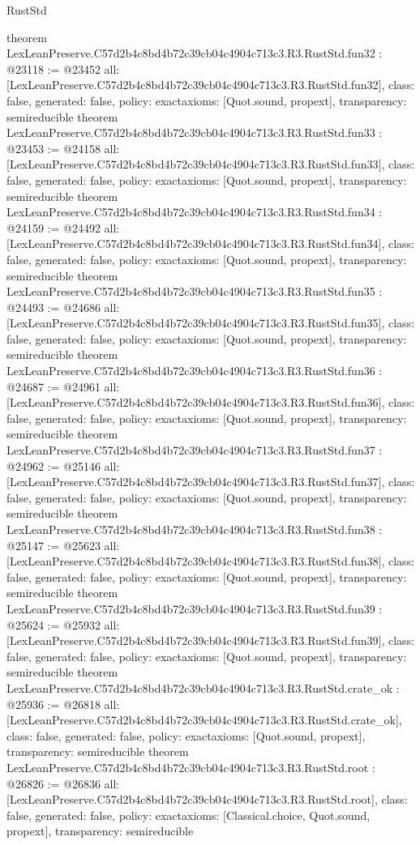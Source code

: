 \begin{lexlean}{RustStd}
\begin{coremodule}
{}
theorem LexLeanPreserve.C57d2b4c8bd4b72c39cb04c4904c713c3.R3.RustStd.fun32 : @23118 := @23452 {
  all: [LexLeanPreserve.C57d2b4c8bd4b72c39cb04c4904c713c3.R3.RustStd.fun32],
  class: false,
  generated: false,
  policy: exact{axioms: [Quot.sound, propext]},
  transparency: semireducible
}
theorem LexLeanPreserve.C57d2b4c8bd4b72c39cb04c4904c713c3.R3.RustStd.fun33 : @23453 := @24158 {
  all: [LexLeanPreserve.C57d2b4c8bd4b72c39cb04c4904c713c3.R3.RustStd.fun33],
  class: false,
  generated: false,
  policy: exact{axioms: [Quot.sound, propext]},
  transparency: semireducible
}
theorem LexLeanPreserve.C57d2b4c8bd4b72c39cb04c4904c713c3.R3.RustStd.fun34 : @24159 := @24492 {
  all: [LexLeanPreserve.C57d2b4c8bd4b72c39cb04c4904c713c3.R3.RustStd.fun34],
  class: false,
  generated: false,
  policy: exact{axioms: [Quot.sound, propext]},
  transparency: semireducible
}
theorem LexLeanPreserve.C57d2b4c8bd4b72c39cb04c4904c713c3.R3.RustStd.fun35 : @24493 := @24686 {
  all: [LexLeanPreserve.C57d2b4c8bd4b72c39cb04c4904c713c3.R3.RustStd.fun35],
  class: false,
  generated: false,
  policy: exact{axioms: [Quot.sound, propext]},
  transparency: semireducible
}
theorem LexLeanPreserve.C57d2b4c8bd4b72c39cb04c4904c713c3.R3.RustStd.fun36 : @24687 := @24961 {
  all: [LexLeanPreserve.C57d2b4c8bd4b72c39cb04c4904c713c3.R3.RustStd.fun36],
  class: false,
  generated: false,
  policy: exact{axioms: [Quot.sound, propext]},
  transparency: semireducible
}
theorem LexLeanPreserve.C57d2b4c8bd4b72c39cb04c4904c713c3.R3.RustStd.fun37 : @24962 := @25146 {
  all: [LexLeanPreserve.C57d2b4c8bd4b72c39cb04c4904c713c3.R3.RustStd.fun37],
  class: false,
  generated: false,
  policy: exact{axioms: [Quot.sound, propext]},
  transparency: semireducible
}
theorem LexLeanPreserve.C57d2b4c8bd4b72c39cb04c4904c713c3.R3.RustStd.fun38 : @25147 := @25623 {
  all: [LexLeanPreserve.C57d2b4c8bd4b72c39cb04c4904c713c3.R3.RustStd.fun38],
  class: false,
  generated: false,
  policy: exact{axioms: [Quot.sound, propext]},
  transparency: semireducible
}
theorem LexLeanPreserve.C57d2b4c8bd4b72c39cb04c4904c713c3.R3.RustStd.fun39 : @25624 := @25932 {
  all: [LexLeanPreserve.C57d2b4c8bd4b72c39cb04c4904c713c3.R3.RustStd.fun39],
  class: false,
  generated: false,
  policy: exact{axioms: [Quot.sound, propext]},
  transparency: semireducible
}
theorem LexLeanPreserve.C57d2b4c8bd4b72c39cb04c4904c713c3.R3.RustStd.crate_ok : @25936 := @26818 {
  all: [LexLeanPreserve.C57d2b4c8bd4b72c39cb04c4904c713c3.R3.RustStd.crate_ok],
  class: false,
  generated: false,
  policy: exact{axioms: [Quot.sound, propext]},
  transparency: semireducible
}
theorem LexLeanPreserve.C57d2b4c8bd4b72c39cb04c4904c713c3.R3.RustStd.root : @26826 := @26836 {
  all: [LexLeanPreserve.C57d2b4c8bd4b72c39cb04c4904c713c3.R3.RustStd.root],
  class: false,
  generated: false,
  policy: exact{axioms: [Classical.choice, Quot.sound, propext]},
  transparency: semireducible
}


\end{coremodule}
\end{lexlean}
